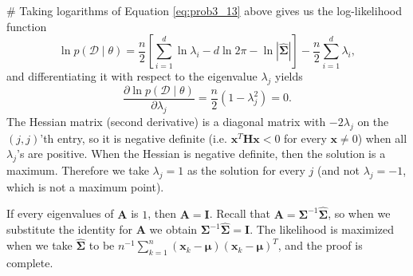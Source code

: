 \documentclass[12pt, a4paper]{article}
\newcommand{\D}{\mathcal{D}}
\newcommand{\vect}[1]{\bm{#1}}
\begin{document}
\begin{easylist}[enumerate]
# Taking logarithms of Equation \eqref{eq:prob3_13} above gives us the log-likelihood function
\begin{equation*}
	\ln p(\D  \mid  \theta) = \frac{n}{2} \left[ \sum_{i=1}^{d} \ln \lambda_i - d \ln 2 \pi - \ln | \hat{\vect{\Sigma}} |  \right] - \frac{n}{2} \sum_{i=1}^{d} \lambda_i,
\end{equation*}
and differentiating it with respect to the eigenvalue $\lambda_j$ yields 
\begin{equation*}
	\frac{\partial \ln p(\D  \mid  \theta)}{\partial \lambda_j} = \frac{n}{2} \left(1 - \lambda_j^2 \right) = 0.
\end{equation*}
The Hessian matrix (second derivative) is a diagonal matrix with $-2\lambda_j$ on the $(j, j)$'th entry, so it is negative definite (i.e. $\vect{x}^T \vect{H} \vect{x} < 0$ for every $\vect{x} \neq 0$) when all $\lambda_j$'s are positive.
When the Hessian is negative definite, then the solution is a maximum.
Therefore we take $\lambda_j = 1$ as the solution for every $j$ (and not $\lambda_j = -1$, which is not a maximum point).

If every eigenvalues of $\vect{A}$ is $1$, then $\vect{A} = \vect{I}$.
Recall that $\vect{A} = \vect{\Sigma}^{-1} \hat{\vect{\Sigma}}$, so when we substitute the identity for $\vect{A}$ we obtain $\vect{\Sigma}^{-1} \hat{\vect{\Sigma}} = \vect{I}$.
The likelihood is maximized when we take $\hat{\vect{\Sigma}}$ to be $ n^{-1} \sum_{k=1}^{n} \left( \vect{x}_k - \vect{\mu} \right) \left( \vect{x}_k - \vect{\mu} \right)^T$, and the proof is complete.
\end{easylist}
\end{document}

